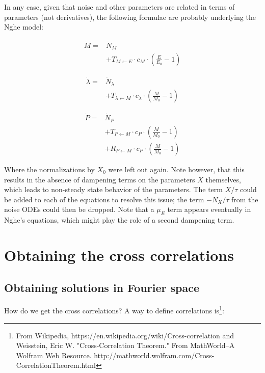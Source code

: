 \documentclass[a4paper,twoside,10pt]{report}
\begin{document}
In any case, given that noise and other parameters are related in terms of parameters (not derivatives), the following formulae are probably underlying the Nghe model:

\begin{align}
\dot{M} = & \dot{N}_M  \nonumber \\ 
& + T_{M\leftarrow E} \cdot c_M \cdot (\frac{E}{E_0} - 1)  
\end{align}

\begin{align}
\dot{\lambda} = & \dot{N}_\lambda \nonumber \\ 
& +    T_{\lambda \leftarrow M} \cdot c_\lambda \cdot (\frac{M}{M_0}-1) 
\end{align}

\begin{align}
\dot{P} = & \dot{N}_P \nonumber \\ 
& + T_{P\leftarrow M} \cdot c_P \cdot (\frac{M}{M_0}-1)  \nonumber \\ 
& + R_{P\leftarrow M} \cdot c_P \cdot (\frac{M}{M_0}-1)
\end{align}

Where the normalizations by $X_0$ were left out again.
Note however, that this results in the absence of dampening terms on the parameters $X$ themselves, which leads to non-steady state behavior of the parameters.
The term $X/\tau$ could be added to each of the equations to resolve this issue; the term $-N_X/\tau$ from the noise ODEs could then be dropped.
Note that a $\mu_E$ term appears eventually in Nghe's equations, which might play the role of a second dampening term.




\section{Obtaining the cross correlations}

\subsection{Obtaining solutions in Fourier space}

How do we get the cross correlations? A way to define correlations is\footnote{From Wikipedia, https://en.wikipedia.org/wiki/Cross-correlation and Weisstein, Eric W. "Cross-Correlation Theorem." From MathWorld--A Wolfram Web Resource. http://mathworld.wolfram.com/Cross-CorrelationTheorem.html}:
\end{document}
